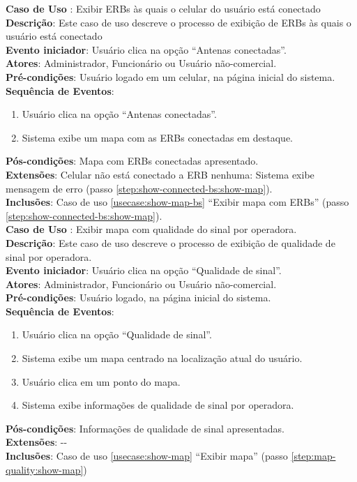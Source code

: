 \documentclass[]{politex}
\begin{document}
\noindent \textbf{Caso de Uso }: Exibir ERBs às quais o celular do usuário está
conectado \\
\textbf{Descrição}: Este caso de uso descreve o processo de exibição de ERBs às
quais o usuário está conectado \\
\textbf{Evento iniciador}: Usuário clica na opção ``Antenas conectadas''. \\
\textbf{Atores}: Administrador, Funcionário ou Usuário não-comercial. \\
\textbf{Pré-condições}: Usuário logado em um celular, na página inicial do
sistema. \\
\textbf{Sequência de Eventos}:
\begin{enumerate}
\item Usuário clica na opção ``Antenas conectadas''.
\item\label{step:show-connected-bs:show-map} Sistema exibe um mapa com as ERBs conectadas em destaque.
\end{enumerate}
\textbf{Pós-condições}: Mapa com ERBs conectadas apresentado. \\
\textbf{Extensões}: Celular não está conectado a ERB nenhuma: Sistema exibe
mensagem de erro (passo \ref{step:show-connected-bs:show-map}). \\
\textbf{Inclusões}: Caso de uso \ref{usecase:show-map-bs} ``Exibir mapa com ERBs'' (passo \ref{step:show-connected-bs:show-map}). \\

\noindent \textbf{Caso de Uso }: Exibir mapa com qualidade do sinal por
operadora. \\
\textbf{Descrição}: Este caso de uso descreve o processo de exibição de
qualidade de sinal por operadora. \\
\textbf{Evento iniciador}: Usuário clica na opção ``Qualidade de sinal''. \\
\textbf{Atores}: Administrador, Funcionário ou Usuário não-comercial. \\
\textbf{Pré-condições}: Usuário logado, na página inicial do sistema. \\
\textbf{Sequência de Eventos}:
\begin{enumerate}
\item Usuário clica na opção ``Qualidade de sinal''.
\item\label{step:map-quality:show-map} Sistema exibe um mapa centrado na localização atual do usuário.
\item Usuário clica em um ponto do mapa.
\item Sistema exibe informações de qualidade de sinal por operadora.
\end{enumerate}
\textbf{Pós-condições}: Informações de qualidade de sinal apresentadas. \\
\textbf{Extensões}: -{}- \\
\textbf{Inclusões}: Caso de uso \ref{usecase:show-map} ``Exibir mapa'' (passo \ref{step:map-quality:show-map}) \\
\end{document}
